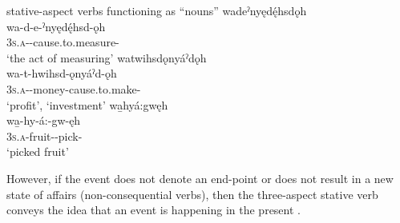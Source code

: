 \ea\label{ex:statasp1} stative-aspect verbs functioning as “nouns”
\ea wadeˀnyędę́hsdǫh\\
\gll wa-d-e-ˀnyędę́hsd-ǫh\\
 \textsc{3s.a}\exsc{-{\semireflexive}}-{\joinerE}-cause.to.measure-{\stative}\\
\glt `the act of measuring'
\ex watwihsdǫnyáˀdǫh \\
\gll wa-t-hwihsd-ǫnyáˀd-ǫh\\
 \textsc{3s.a}-{\semireflexive}-money-cause.to.make-{\stative}\\
\glt ‘profit’, `investment'
\ex wa̱hyá:gwęh\\
\gll wa̱-hy-á:-gw-ęh\\
 \textsc{3s.a}-fruit-{\joinerA}-pick-{\stative}\\
\glt `picked fruit'
\z
\z

However, if the event does not denote an end-point or does not result in a new state of affairs (non-consequential verbs), then the three-aspect stative verb  conveys the idea that an event is happening in the present .  

